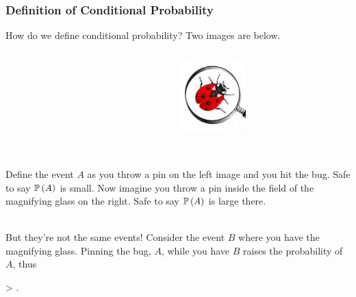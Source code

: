 \documentclass[slides]{beamer} %
\begin{document}
\begin{frame}
	\frametitle{Definition of Conditional Probability}

\scriptsize
How do we define conditional probability? Two images are  below. \pause 

\begin{columns}[T] %
\begin{column}{.48\textwidth}
\begin{figure}
\centering
{}
\end{figure}
\end{column}%
\hfill%
\begin{column}{.48\textwidth}
\begin{figure}
\centering
\includegraphics[width=1.0in]{images/magn.jpeg}
\end{figure}
\end{column}%
\end{columns}	~\\



Define the event $A$ as you throw a pin on the left image and you hit the bug. \pause Safe to say $\mathbb{P}\left(A\right)$ is small. \pause Now imagine you throw a pin inside the field of the magnifying glass on the right. Safe to say $\mathbb{P}\left(A\right)$ is large there. \\~\pause 

But they're not the same events! Consider the event $B$ where you have the magnifying glass. Pinning the bug, $A$, while you have $B$ raises the probability of $A$, thus\pause 

\beqn
{} > .
\eeqn

\end{frame}
\end{document}
